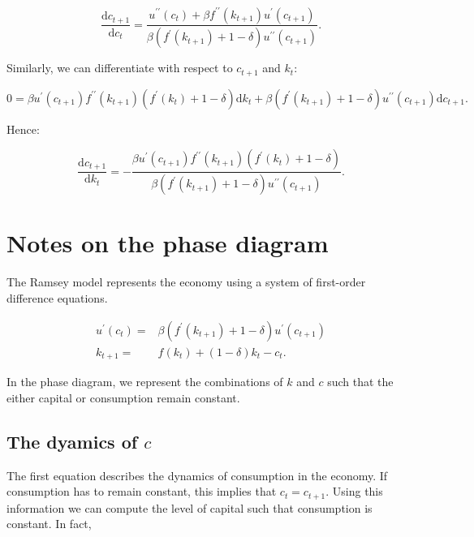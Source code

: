 \documentclass[11pt,a4paper,english]{article}
\begin{document}
\begin{equation*}
    \frac{\mathrm{d}c_{t+1}}{\mathrm{d}c_t} = \frac{u^{\prime \prime}(c_t) + \beta f^{\prime \prime}(k_{t+1}) u^\prime (c_{t+1})}{\beta \left(f^\prime (k_{t+1}) + 1 - \delta \right) u^{\prime \prime}(c_{t+1})}.
\end{equation*}

Similarly, we can differentiate with respect to $c_{t+1}$ and $k_t$:

\begin{equation*}
    0 = \beta u^\prime (c_{t+1})f^{\prime \prime}(k_{t+1})\left(f^\prime (k_t)+1-\delta\right)\mathrm{d}k_t + \beta\left(f^\prime(k_{t+1}) + 1 - \delta \right)u^{\prime \prime}(c_{t+1})\mathrm{d}c_{t+1}.
\end{equation*}

Hence:

\begin{equation*}
    \frac{\mathrm{d}c_{t+1}}{\mathrm{d}k_t} = -\frac{\beta u^\prime(c_{t+1})f^{\prime \prime}(k_{t+1})\left(f^\prime(k_t)+1-\delta\right)}{\beta \left( f^\prime(k_{t+1})+1-\delta\right)u^{\prime \prime}(c_{t+1})}.
\end{equation*}

\section{Notes on the phase diagram}

The Ramsey model represents the economy using a system of first-order difference equations.

\begin{align*}
    u^\prime(c_t) =&\beta (f^\prime(k_{t+1}) + 1 - \delta) u^\prime(c_{t+1}) \\
    k_{t+1} =& f(k_t) + (1-\delta)k_t - c_t.
\end{align*}

In the phase diagram, we represent the combinations of $k$ and $c$ such that the either capital or consumption remain constant.

\subsection{The dyamics of $c$}

The first equation describes the dynamics of consumption in the economy.
If consumption has to remain constant, this implies that $c_t = c_{t+1}.$
Using this information we can compute the level of capital such that consumption is constant.
In fact,
\end{document}
